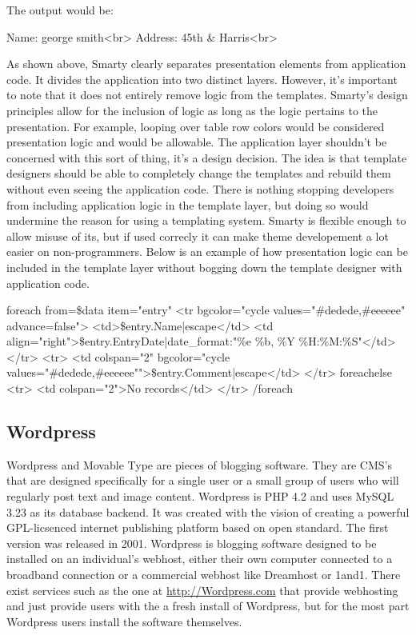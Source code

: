 \documentclass[a4paper,12pt]{report}
\begin{document}
The output would be:

Name: george smith<br>
Address: 45th & Harris<br>

As shown above, Smarty clearly separates presentation elements from application code. 
It divides the application into two distinct layers. 
However, it's important to note that it does not entirely remove logic from the templates. 
Smarty's design principles allow for the inclusion of logic as long as the logic pertains to the presentation. 
For example, looping over table row colors would be considered presentation logic and would be allowable. 
The application layer shouldn't be concerned with this sort of thing, it's a design decision. 
The idea is that template designers should be able to completely change the templates and rebuild them without even seeing the application code.
There is nothing stopping developers from including application logic in the template layer, but doing so would undermine the reason for using a templating system. 
Smarty is flexible enough to allow misuse of its, but if used correcly it can make theme developement a lot easier on non-programmers. 
Below is an example of how presentation logic can be included in the template layer without bogging down the template designer with application code. 

    {foreach from=\$data item="entry"}
        <tr bgcolor="{cycle values="#dedede,#eeeeee" advance=false}">
            <td>{\$entry.Name|escape}</td>        
            <td align="right">{\$entry.EntryDate|date_format:"\%e \%b, \%Y \%H:\%M:\%S"}</td>        
        </tr>
        <tr>
            <td colspan="2" bgcolor="{cycle values="#dedede,#eeeeee"}">{\$entry.Comment|escape}</td>
        </tr>
    {foreachelse}
        <tr>
            <td colspan="2">No records</td>
        </tr>
    {/foreach}


\subsection {Wordpress}
Wordpress and Movable Type are pieces of blogging software. 
They are CMS's that are designed specifically for a single user or a small group of users who will regularly post text and image content. 
Wordpress is PHP 4.2 and uses MySQL 3.23 as its database backend. 
It was created with the vision of creating a powerful GPL-licsenced internet publishing platform based on open standard. 
The first version was released in 2001. 
Wordpress is blogging software designed to be installed on an individual's webhost, either their own computer connected to a broadband connection or a commercial webhost like Dreamhost or 1and1. There exist services such as the one at \url{http://Wordpress.com} that provide webhosting and just provide users with the a fresh install of Wordpress, but for the most part Wordpress users install the software themselves. 
\end{document}
